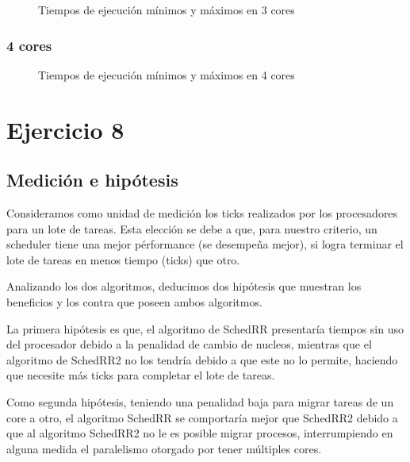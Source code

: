 \documentclass[a4paper,10pt,twoside]{article}
\begin{document}
\begin{figure}[H]
	\centering
	
	\caption{Tiempos de ejecución mínimos y máximos en 3 cores}
\end{figure}


\subsubsection{4 cores}

\begin{figure}[H]
	\centering
	
	\caption{Tiempos de ejecución mínimos y máximos en 4 cores}
\end{figure}







\section{Ejercicio 8}

\subsection{Medición e hipótesis}
Consideramos como unidad de medición los ticks realizados por los procesadores para un lote de tareas. Esta elección se debe a que, para nuestro criterio, un scheduler tiene una mejor pérformance (se desempeña mejor), si logra terminar el lote de tareas en menos tiempo (ticks) que otro.

Analizando los dos algoritmos, deducimos dos hipótesis que muestran los beneficios y los contra que poseen ambos algoritmos.

La primera hipótesis es que, el algoritmo de SchedRR presentaría tiempos sin uso del procesador debido a la penalidad de cambio de nucleos, mientras que el algoritmo de SchedRR2 no los tendría debido a que este no lo permite, haciendo que necesite más ticks para completar el lote de tareas.

Como segunda hipótesis, teniendo una penalidad baja para migrar tareas de un core a otro,  el algoritmo SchedRR se comportaría mejor que SchedRR2 debido a que al algoritmo SchedRR2 no le es posible migrar procesos, interrumpiendo en alguna medida el paralelismo otorgado por tener múltiples cores.
\end{document}
